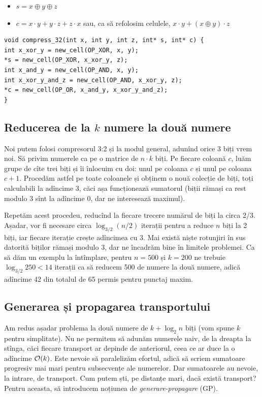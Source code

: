 \documentclass[../main.tex]{subfiles}
\begin{document}
\begin{itemize}
  \item $s = x \oplus y \oplus z$
  \item $c = x \cdot y + y \cdot z + z \cdot x$ sau, ca să refolosim celulele, $x \cdot y + (x \oplus y) \cdot z$
\end{itemize}

\begin{verbatim}
void compress_32(int x, int y, int z, int* s, int* c) {
int x_xor_y = new_cell(OP_XOR, x, y);
*s = new_cell(OP_XOR, x_xor_y, z);
int x_and_y = new_cell(OP_AND, x, y);
int x_xor_y_and_z = new_cell(OP_AND, x_xor_y, z);
*c = new_cell(OP_OR, x_and_y, x_xor_y_and_z);
}
\end{verbatim}

\subsection{Reducerea de la \texorpdfstring{$k$}{k} numere la două numere}

Noi putem folosi compresorul 3:2 și la modul general, adunînd orice 3 biți vrem noi. Să privim numerele ca pe o matrice de $n \cdot k$ biți. Pe fiecare coloană $c$, luăm grupe de cîte trei biți și îi înlocuim cu doi: unul pe coloana $c$ și unul pe coloana $c + 1$. Procedăm astfel pe toate coloanele și obținem o nouă colecție de biți, toți calculabili la adîncime 3, căci așa funcționează sumatorul (biții rămași ca rest modulo 3 sînt la adîncime 0, dar ne interesează maximul).

Repetăm acest procedeu, reducînd la fiecare trecere numărul de biți la circa 2/3. Așadar, vor fi necesare circa $\log_{3/2}(n/2)$ iterații pentru a reduce $n$ biți la 2 biți, iar fiecare iterație crește adîncimea cu 3. Mai există niște rotunjiri în sus datorită biților rămași modulo 3, dar ne încadrăm bine în limitele problemei. Ca să dăm un exemplu la întîmplare, pentru $n = 500$ și $k = 200$ ne trebuie $\log_{3/2} 250 < 14$ iterații ca să reducem 500 de numere la două numere, adică adîncime 42 din totalul de 65 permis pentru punctaj maxim.

\subsection{Generarea și propagarea transportului}

Am redus așadar problema la două numere de $k + \log_2 n$ biți (vom spune $k$ pentru simplitate). Nu ne permitem să adunăm numerele naiv, de la dreapta la stînga, căci fiecare transport ar depinde de anteriorul, ceea ce ar duce la o adîncime $\mathcal{O}(k)$. Este nevoie să paralelizăm efortul, adică să scriem sumatoare progresiv mai mari pentru subsecvențe ale numerelor. Dar sumatoarele au nevoie, la intrare, de transport. Cum putem ști, pe distanțe mari, dacă există transport? Pentru aceasta, să introducem noțiunea de \textit{generare-propagare} (GP).
\end{document}
